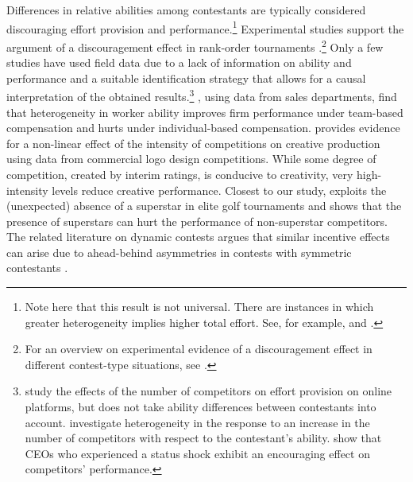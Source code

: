 \documentclass[11pt,a4paper]{article}
\begin{document}
Differences in relative abilities among contestants are typically considered discouraging effort provision and performance.\footnote{Note here that this result is not universal. There are instances in which greater heterogeneity implies higher total effort. See, for example,  and .} 
Experimental studies support the argument of a discouragement effect in rank-order tournaments \cite{Bull.1987, Schotter.1992}.\footnote{For an overview on experimental evidence of a discouragement effect in different contest-type situations, see .} Only a few studies have used field data due to a lack of information on ability and performance and a suitable identification strategy that allows for a causal interpretation of the obtained results.\footnote{ study the effects of the number of competitors on effort provision on online platforms, but does not take ability differences between contestants into account.  investigate heterogeneity in the response to an increase in the number of competitors with respect to the contestant's ability.  show that CEOs who experienced a status shock exhibit an encouraging effect on competitors' performance.} , using data from sales departments, find that heterogeneity in worker ability improves firm performance under team-based compensation and hurts under individual-based compensation.  provides evidence for a non-linear effect of the intensity of competitions on creative production using data from commercial logo design competitions. While some degree of competition, created by interim ratings, is conducive to creativity, very high-intensity levels reduce creative performance. Closest to our study,  exploits the (unexpected) absence of a superstar in elite golf tournaments and shows that the presence of superstars can hurt the performance of non-superstar competitors. The related literature on dynamic contests argues that similar incentive effects can arise due to ahead-behind asymmetries in contests with symmetric contestants \cite{Malueg.2010, Gauriot.2019}.\par
\end{document}
